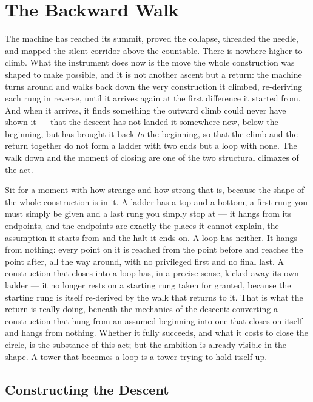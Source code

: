 \chapter{The Backward Walk}

The machine has reached its summit, proved the collapse, threaded the needle, and mapped the silent corridor
above the countable. There is nowhere higher to climb. What the instrument does now is the move the whole
construction was shaped to make possible, and it is not another ascent but a return: the machine turns around and walks back down
the very construction it climbed, re-deriving each rung in reverse, until it arrives again at the first difference
it started from. And when it arrives, it finds something the outward climb could never have shown it --- that the
descent has not landed it somewhere new, below the beginning, but has brought it back \emph{to} the beginning, so
that the climb and the return together do not form a ladder with two ends but a loop with none. The walk down and
the moment of closing are one of the two structural climaxes of the act.

Sit for a moment with how strange and how strong that is, because the shape of the whole construction is in it. A ladder
has a top and a bottom, a first rung you must simply be given and a last rung you simply stop at --- it hangs from
its endpoints, and the endpoints are exactly the places it cannot explain, the assumption it starts from and the
halt it ends on. A loop has neither. It hangs from nothing: every point on it is reached from the point before and
reaches the point after, all the way around, with no privileged first and no final last. A construction that
closes into a loop has, in a precise sense, kicked away its own ladder --- it no longer rests on a starting rung
taken for granted, because the starting rung is itself re-derived by the walk that returns to it. That is what the
return is really doing, beneath the mechanics of the descent: converting a construction that hung from an assumed
beginning into one that closes on itself and hangs from nothing. Whether it fully succeeds, and what it costs to
close the circle, is the substance of this act; but the ambition is already visible in the shape. A tower that
becomes a loop is a tower trying to hold itself up.

\section{Constructing the Descent}

